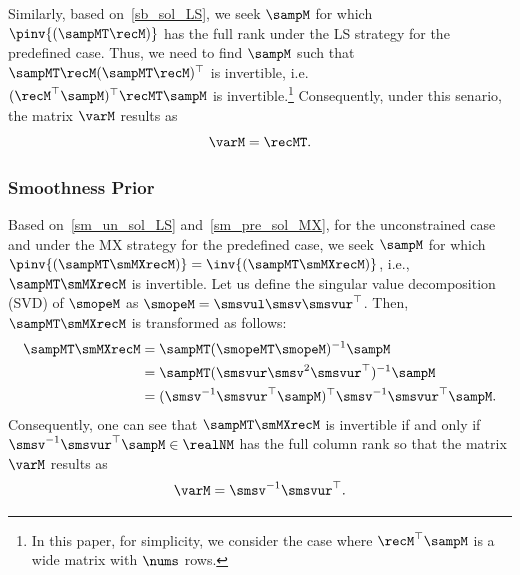 \documentclass[journal]{IEEEtran}
\begin{document}
Similarly, based on~\eqref{sb_sol_LS}, we seek $\sampM$ for which $\pinv{(\sampMT\recM)}$ has the full rank under the LS strategy for the predefined case.
Thus, we need to find $\sampM$ such that $\sampMT \recM (\sampMT \recM)^\top$ is invertible, i.e. $(\recM^\top \sampM)^\top \recMT \sampM$ is invertible.\footnote{In this paper, for simplicity, we consider the case where $\recM^\top \sampM$ is a wide matrix with $\nums$ rows.}
Consequently, under this senario, the matrix $\varM$ results as 
\begin{equation}
    \varM = \recMT.
\end{equation}

\subsubsection{Smoothness Prior}
Based on~\eqref{sm_un_sol_LS} and~\eqref{sm_pre_sol_MX}, for the unconstrained case and under the MX strategy for the predefined case, we seek $\sampM$ for which $\pinv{(\sampMT \smMXrecM)} = \inv{(\sampMT \smMXrecM)}$, i.e., $\sampMT \smMXrecM$ is invertible.
Let us define the singular value decomposition (SVD) of $\smopeM$ as $\smopeM = \smsvul \smsv \smsvur^\top$.
Then, $\sampMT \smMXrecM$ is transformed as follows:
\begin{align}
    \sampMT \smMXrecM &= \sampMT (\smopeMT\smopeM)^{-1}\sampM  \nonumber \\
    &= \sampMT (\smsvur \smsv^{2} \smsvur^\top)^{-1}\sampM \nonumber \\
    &= (\smsv^{-1} \smsvur^\top \sampM)^\top \smsv^{-1} \smsvur^\top \sampM.
\end{align}
Consequently, one can see that $\sampMT \smMXrecM$ is invertible if and only if $\smsv^{-1} \smsvur^\top \sampM \in \realNM$ has the full column rank so that the matrix $\varM$ results as
\begin{equation}
    \varM = \smsv^{-1} \smsvur^\top.
\end{equation}
\end{document}
